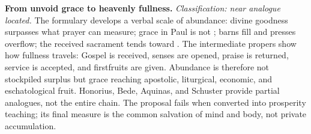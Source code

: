 \noindent\textbf{From unvoid grace to heavenly fullness.\enspace{}}
\emph{Classification: near analogue located.} The formulary develops a verbal
scale of abundance: divine goodness surpasses what prayer can measure; grace in
Paul is not ; barns fill and presses overflow; the received
sacrament tends toward . The intermediate
propers show how fullness travels: Gospel is received, senses are opened,
praise is returned, service is accepted, and firstfruits are given. Abundance
is therefore not stockpiled surplus but grace reaching apostolic, liturgical,
economic, and eschatological fruit. Honorius, Bede, Aquinas, and Schuster
provide partial analogues, not the entire chain. The proposal fails when
converted into prosperity teaching; its final measure is the common salvation
of mind and body, not private accumulation.
